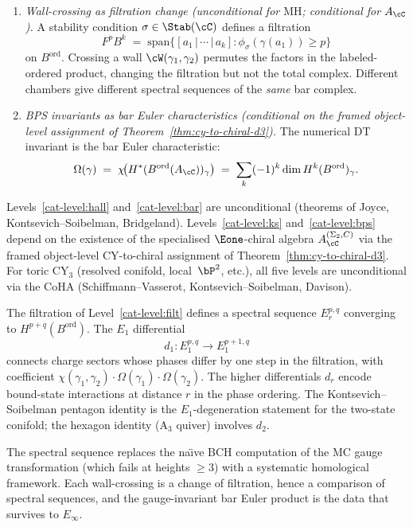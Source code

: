 \begin{conjecture}
\begin{enumerate}[label=\textup{(L\arabic*)}]
\item\label{cat-level:filt} \emph{Wall-crossing as filtration change \textup{(unconditional for $\mathrm{MH}$; conditional for $A_\cC$)}.} A stability condition $\sigma \in \Stab(\cC)$ defines a filtration
\[
 F^p B^k \;=\; \mathrm{span}\!\bigl\{[a_1 \,|\, \cdots \,|\, a_k] : \phi_\sigma(\gamma(a_1)) \geq p\bigr\}
\]
on $B^{\mathrm{ord}}$. Crossing a wall $\cW(\gamma_1, \gamma_2)$ permutes the factors in the labeled-ordered product, changing the filtration but not the total complex. Different chambers give different spectral sequences of the \emph{same} bar complex.

\item\label{cat-level:bps} \emph{BPS invariants as bar Euler characteristics \textup{(conditional on the framed object-level assignment of Theorem~\textup{\ref{thm:cy-to-chiral-d3}})}.} The numerical DT invariant is the bar Euler characteristic:
\[
 \Omega(\gamma) \;=\; \chi\!\bigl(H^\ast(B^{\mathrm{ord}}(A_\cC))_\gamma\bigr) \;=\; \sum_k (-1)^k \dim H^k(B^{\mathrm{ord}})_\gamma.
\]
\end{enumerate}

Levels~\ref{cat-level:hall} and~\ref{cat-level:bar} are unconditional (theorems of Joyce, Kontsevich--Soibelman, Bridgeland). Levels~\ref{cat-level:ks} and~\ref{cat-level:bps} depend on the existence of the specialised $\Eone$-chiral algebra $A_\cC^{(\Sigma_2,C)}$ via the framed object-level CY-to-chiral assignment of Theorem~\ref{thm:cy-to-chiral-d3}. For toric CY$_3$ (resolved conifold, local~$\bP^2$, etc.), all five levels are unconditional via the CoHA (Schiffmann--Vasserot, Kontsevich--Soibelman, Davison).
\end{conjecture}

\begin{remark}
\label{rem:spectral-sequence-stability}
The filtration of Level~\ref{cat-level:filt} defines a spectral sequence $E_r^{p,q}$ converging to $H^{p+q}(B^{\mathrm{ord}})$. The $E_1$ differential
\[
 d_1 \colon E_1^{p,q} \longrightarrow E_1^{p+1,q}
\]
connects charge sectors whose phases differ by one step in the filtration, with coefficient $\chi(\gamma_1, \gamma_2) \cdot \Omega(\gamma_1) \cdot \Omega(\gamma_2)$. The higher differentials $d_r$ encode bound-state interactions at distance $r$ in the phase ordering. The Kontsevich--Soibelman pentagon identity is the $E_1$-degeneration statement for the two-state conifold; the hexagon identity (A$_3$ quiver) involves $d_2$.

The spectral sequence replaces the na\"{\i}ve BCH computation of the MC gauge transformation (which fails at heights $\geq 3$) with a systematic homological framework. Each wall-crossing is a change of filtration, hence a comparison of spectral sequences, and the gauge-invariant bar Euler product is the data that survives to $E_\infty$.
\end{remark}

